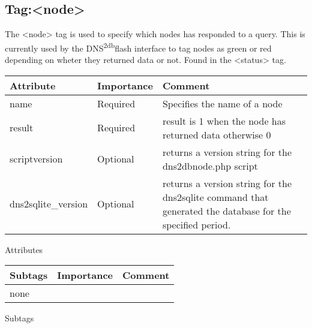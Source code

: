 \documentclass[a4paper]{article}
\newcommand{\xml}[1]{\textless#1\textgreater}
\newcommand{\dnsdb}{DNS\textsuperscript{2db}}
\begin{document}
    \subsection{Tag:\xml{node}  }
    The \xml{node} tag is used to specify which nodes has responded to a query. 
    This is currently used by the \dnsdb flash interface to tag nodes as green 
    or red depending on wheter they returned data or not. 
    Found in the \xml{status} tag.
    \begin{center}
        \begin{tabular}{ | p{2.6cm} | p{2.0cm} | p{8.5cm} |}
        \hline
        \textbf{Attribute} & \textbf{Importance} & \textbf{Comment}  
        \\ \hline
        name
        &
        Required
        &
        Specifies the name of a node
        \\ \hline
        result
        &
        Required
        &
        result is 1 when the node has returned data otherwise 0 
        \\ \hline
        scriptversion
        &
        Optional
        &
        returns a version string for the dns2dbnode.php script
        \\ \hline
        dns2sqlite\_version
        &
        Optional
        &
        returns a version string for the dns2sqlite command that generated 
        the database for the specified period.
        \\ \hline
        \end{tabular}
        
        \small Attributes
        
        \begin{tabular}{ | p{2.1cm} | p{2cm} | p{9cm} |}
        \hline
        \textbf{Subtags} & \textbf{Importance} & \textbf{Comment}  
        \\ \hline
        none
        & &
        \\ \hline
        \end{tabular}
        
        \small Subtags
    \end{center}        
\end{document}
